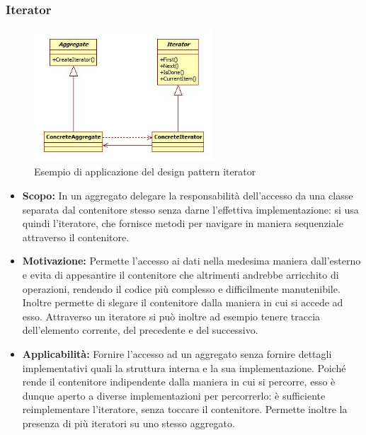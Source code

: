 \documentclass{scalatekids-article}
\begin{document}
\subsubsection{Iterator}
\begin{figure}[H]
	\begin{center}
		\includegraphics[width=0.6\textwidth, keepaspectratio]{img/designPattern/IteratorPattern.png}
		\caption{Esempio di applicazione del design pattern iterator}
	\end{center}
\end{figure}
\begin{itemize}
	\item \textbf{Scopo:} In un aggregato delegare la responsabilità dell'accesso da una classe separata dal contenitore stesso senza darne l'effettiva implementazione: si usa quindi l'iteratore, che fornisce metodi per navigare in maniera sequenziale attraverso il contenitore.
	\item \textbf{Motivazione:} Permette l'accesso ai dati nella medesima maniera dall'esterno e evita di appesantire il contenitore che altrimenti andrebbe arricchito di operazioni, rendendo il codice più complesso e difficilmente manutenibile. Inoltre permette di slegare il contenitore dalla maniera in cui si accede ad esso. Attraverso un iteratore si può inoltre ad esempio tenere traccia dell'elemento corrente, del precedente e del successivo.
	\item \textbf{Applicabilità:} Fornire l'accesso ad un aggregato senza fornire dettagli implementativi quali la struttura interna e la sua implementazione. Poiché rende  il contenitore indipendente dalla maniera in cui si percorre, esso è dunque aperto a diverse implementazioni per percorrerlo: è sufficiente reimplementare l'iteratore, senza toccare il contenitore. Permette inoltre la presenza di più iteratori su uno stesso aggregato.
\end{itemize}
\end{document}
